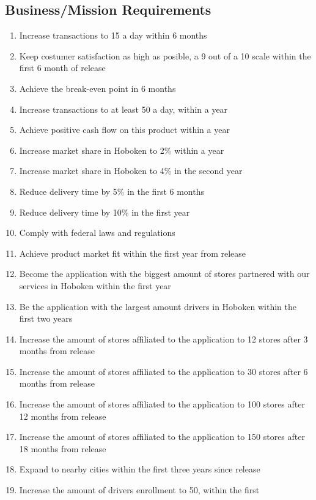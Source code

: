 \subsection{Business/Mission Requirements}
\begin{enumerate}[label=BR-\arabic*]
    \item Increase transactions to 15 a day within 6 months
    \item Keep costumer satisfaction as high as posible, a 9 out of a 10 scale 
    within the first 6 month of release
    \item Achieve the break-even point in 6 months
    \item Increase transactions to at least 50 a day, within a year
    \item Achieve positive cash flow on this product within a year
    \item Increase market share in Hoboken to 2\% within a year
    \item Increase market share in Hoboken to 4\% in the second year
    \item Reduce delivery time by 5\% in the first 6 months
    \item Reduce delivery time by 10\% in the first year
    \item Comply with federal laws and regulations
    \item Achieve product market fit within the first year from release
    \item Become the application with the biggest amount of stores partnered 
    with our services in Hoboken within the first year
    \item Be the application with the largest amount drivers in Hoboken 
    within the first two years
    \item Increase the amount of stores affiliated to the application to 12 
    stores after 3 months from release
    \item Increase the amount of stores affiliated to the application to 30 
    stores after 6 months from release
    \item Increase the amount of stores affiliated to the application to 100 
    stores after 12 months from release
    \item Increase the amount of stores affiliated to the application to 150 
    stores after 18 months from release
    \item Expand to nearby cities within the first three years since release
    \item Increase the amount of drivers enrollment to 50, within the first 

\end{enumerate}
